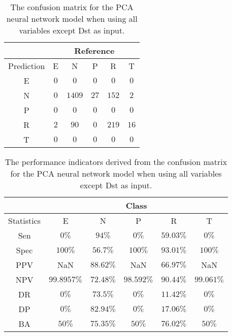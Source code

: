 \begin{table}[!ht]
	\centering
	\begin{tabular}{|c|c|c|c|c|c|}
		\hline
		 & \multicolumn{5}{|c|}{Reference} \\ \hline
		 Prediction & E & N & P & R & T \\ \hline
		 E & $0$ & $0$ & $0$ & $0$ & $0$ \\ \hline
		 N & $0$ & $1409$ & $27$ & $152$ & $2$ \\ \hline
		 P & $0$ & $0$ & $0$ & $0$ & $0$ \\ \hline
		 R & $2$ & $90$ & $0$ & $219$ & $16$ \\ \hline
		 T & $0$ & $0$ & $0$ & $0$ & $0$ \\ \hline
	\end{tabular}
	\caption{The confusion matrix for the PCA neural network model when using all variables except Dst as input.}
	\label{tab:cm:noDst:pcaNNet}
\end{table}

\begin{table}[!ht]
	\centering
	\begin{tabular}{|c|c|c|c|c|c|}
		\hline
		 & \multicolumn{5}{c|}{Class} \\ \hline
		Statistics & E & N & P & R & T \\ \hline
		Sen & $0\%$ & $94\%$ & $0\%$ & $59.03\%$ & $0\%$ \\ \hline
		Spec & $100\%$ & $56.7\%$ & $100\%$ & $93.01\%$ & $100\%$ \\ \hline
		PPV & NaN & $88.62\%$ & NaN & $66.97\%$ & NaN \\ \hline
		NPV & $99.8957\%$ & $72.48\%$ & $98.592\%$ & $90.44\%$ & $99.061\%$ \\ \hline
		DR & $0\%$ & $73.5\%$ & $0\%$ & $11.42\%$ & $0\%$ \\ \hline
		DP & $0\%$ & $82.94\%$ & $0\%$ & $17.06\%$ & $0\%$ \\ \hline
		BA & $50\%$ & $75.35\%$ & $50\%$ & $76.02\%$ & $50\%$ \\ \hline
	\end{tabular}
	\caption{The performance indicators derived from the confusion matrix for the PCA neural network model when using all variables except Dst as input.}
	\label{tab:cs:reverse:noDst:pcaNNet}
\end{table}

